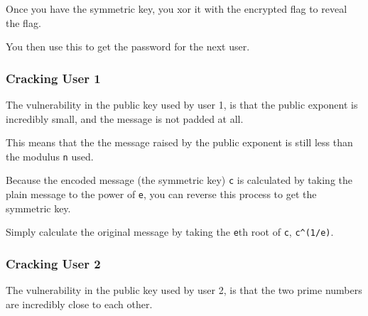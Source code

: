 {{                            Once you have the symmetric key, you xor it with the encrypted flag to reveal the flag. 







                            You then use this to get the password for the next user.







                        \subsubsection*{Cracking User 1}







                            The vulnerability in the public key used by user 1, is that the public exponent is incredibly small, and the message is not padded at all. %







This means that the the message raised by the public exponent is still less than the modulus \lstinline`n` used. %







Because the encoded message (the symmetric key) \lstinline`c` is calculated by taking the plain message to the power of \lstinline`e`, you can reverse this process to get the symmetric key. %







Simply calculate the original message by taking the \lstinline`e`th root of \lstinline`c`, \lstinline`c^(1/e)`.







                        \subsubsection*{Cracking User 2}







                            The vulnerability in the public key used by user 2, is that the two prime numbers are incredibly close to each other. %







}}
